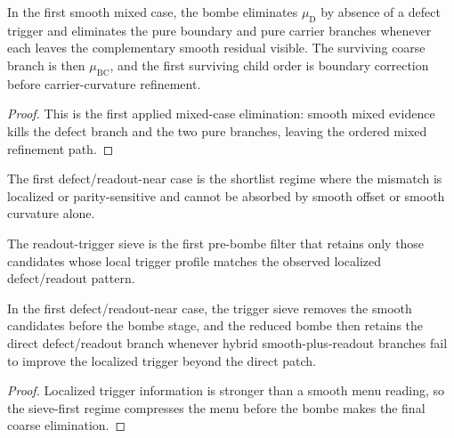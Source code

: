 \begin{proposition}
\label{prop:first-bombe-reduction-in-the-smooth-mixed-optical-case}
In the first smooth mixed case, the bombe eliminates $\mu_{\mathrm D}$ by absence of a defect trigger and eliminates the pure boundary and pure carrier branches whenever each leaves the complementary smooth residual visible. The surviving coarse branch is then $\mu_{\mathrm{BC}}$, and the first surviving child order is boundary correction before carrier-curvature refinement.
\end{proposition}

\begin{proof}
This is the first applied mixed-case elimination: smooth mixed evidence kills the defect branch and the two pure branches, leaving the ordered mixed refinement path.
\end{proof}

\begin{definition}
\label{def:first-defect-readout-near-shortlist-case}
The first defect/readout-near case is the shortlist regime where the mismatch is localized or parity-sensitive and cannot be absorbed by smooth offset or smooth curvature alone.
\end{definition}

\begin{definition}
\label{def:readout-trigger-sieve}
The readout-trigger sieve is the first pre-bombe filter that retains only those candidates whose local trigger profile matches the observed localized defect/readout pattern.
\end{definition}

\begin{proposition}
\label{prop:first-trigger-sieve-plus-bombe-reduction-in-the-defect-readout-near-optical-case}
In the first defect/readout-near case, the trigger sieve removes the smooth candidates before the bombe stage, and the reduced bombe then retains the direct defect/readout branch whenever hybrid smooth-plus-readout branches fail to improve the localized trigger beyond the direct patch.
\end{proposition}

\begin{proof}
Localized trigger information is stronger than a smooth menu reading, so the sieve-first regime compresses the menu before the bombe makes the final coarse elimination.
\end{proof}

